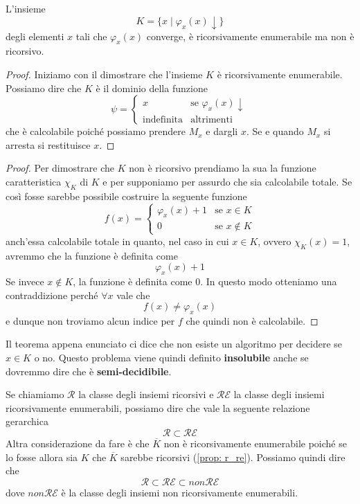 \begin{theorem} \label{th: K_re_not_r}
	L'insieme
	\[ K = \{ x \mid \varphi_x(x) \downarrow \} \]
	degli elementi $x$ tali che $\varphi_x (x)$ converge, è
	ricorsivamente enumerabile ma non è ricorsivo.
	\begin{proof}
		Iniziamo con il dimostrare che l'insieme $K$ è
		ricorsivamente enumerabile. Possiamo dire che $K$ è il
		dominio della funzione
		\[
			\psi = \begin{cases}
				x                 & \text{se } \varphi_x(x) \downarrow \\
				\text{indefinita} & \text{altrimenti}
			\end{cases}
		\]
		che è calcolabile poiché possiamo prendere $M_x$ e
		dargli $x$. Se e quando $M_x$ si arresta si restituisce
		$x$.
	\end{proof}
	\begin{proof}
		Per dimostrare che $K$ non è ricorsivo prendiamo la sua
		la funzione caratteristica $\chi_K$ di $K$ e per
		supponiamo per assurdo che sia calcolabile totale. Se
		così fosse sarebbe possibile costruire la seguente
		funzione
		\[
			f(x) = \begin{cases}
				\varphi_x (x) + 1 & \text{se } x \in K    \\
				0                 & \text{se } x \notin K
			\end{cases}
		\]
		anch'essa calcolabile totale in quanto, nel caso in cui
		$x \in K$, ovvero $\chi_K(x) = 1$, avremmo che la
		funzione è definita come
		\[ \varphi_x (x) + 1 \]
		Se invece $x \notin K$, la funzione è definita come $0$.
		In questo modo otteniamo una contraddizione perché
		$\forall x$ vale che
		\[ f(x) \neq \varphi_x (x) \]
		e dunque non troviamo alcun indice per $f$ che quindi
		non è calcolabile.
	\end{proof}
\end{theorem}

Il teorema appena enunciato ci dice che non esiste un algoritmo
per decidere se $x \in K$ o no. Questo problema viene quindi
definito \textbf{insolubile} anche se dovremmo dire che è
\textbf{semi-decidibile}.

Se chiamiamo $\mathcal{R}$ la classe degli insiemi ricorsivi e
$\mathcal{RE}$ la classe degli insiemi ricorsivamente
enumerabili, possiamo dire che vale la seguente relazione
gerarchica
\[ \mathcal{R} \subset	\mathcal{RE} \]
Altra considerazione da fare è che $\overline{K}$ non è
ricorsivamente enumerabile poiché se lo fosse allora sia $K$
che $\overline{K}$ sarebbe ricorsivi (\ref{prop: r_re}).
Possiamo quindi dire che
\[ \mathcal{R} \subset \mathcal{RE} \subset non\mathcal{RE} \]
dove $non \mathcal{RE}$ è la classe degli insiemi non
ricorsivamente enumerabili.

